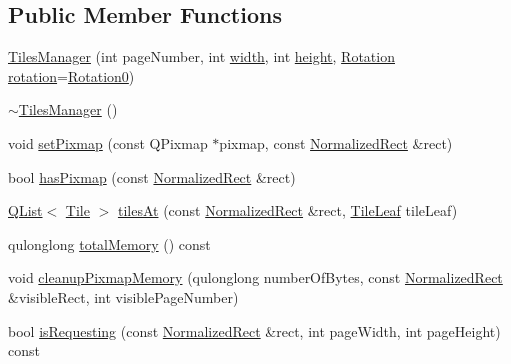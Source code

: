 \subsection*{Public Member Functions}
\begin{DoxyCompactItemize}
\item 
\hyperlink{classOkular_1_1TilesManager_ad9384239a9dadf71c03a123bb46f81f9}{Tiles\+Manager} (int page\+Number, int \hyperlink{classOkular_1_1TilesManager_a88a40f389b20ca54314754aff2392889}{width}, int \hyperlink{classOkular_1_1TilesManager_a4a2fc0597872d6cd291630c2e4bf6986}{height}, \hyperlink{namespaceOkular_a8556d00465f61ef533c6b027669e7da6}{Rotation} \hyperlink{classOkular_1_1TilesManager_af09b92144bc61eb3d499e56b18bbba4f}{rotation}=\hyperlink{namespaceOkular_a8556d00465f61ef533c6b027669e7da6aa4df8fc3dd09e30520c264c8d23d89c2}{Rotation0})
\item 
\hyperlink{classOkular_1_1TilesManager_af1e37d42b705031cc2572328d1d34e88}{$\sim$\+Tiles\+Manager} ()
\item 
void \hyperlink{classOkular_1_1TilesManager_ad7d59e5d6f4a9744ecd98f052b260b79}{set\+Pixmap} (const Q\+Pixmap $\ast$pixmap, const \hyperlink{classOkular_1_1NormalizedRect}{Normalized\+Rect} \&rect)
\item 
bool \hyperlink{classOkular_1_1TilesManager_ab0042fc9b9267a15d67d7f2d29471619}{has\+Pixmap} (const \hyperlink{classOkular_1_1NormalizedRect}{Normalized\+Rect} \&rect)
\item 
\hyperlink{classQList}{Q\+List}$<$ \hyperlink{classOkular_1_1Tile}{Tile} $>$ \hyperlink{classOkular_1_1TilesManager_a11cc64225aa62df9d25e294ce71e4dcf}{tiles\+At} (const \hyperlink{classOkular_1_1NormalizedRect}{Normalized\+Rect} \&rect, \hyperlink{classOkular_1_1TilesManager_a89f92ae8fdfb530b5625343876f63e29}{Tile\+Leaf} tile\+Leaf)
\item 
qulonglong \hyperlink{classOkular_1_1TilesManager_a7baf6b1ce882f1fea1499fa956097c23}{total\+Memory} () const 
\item 
void \hyperlink{classOkular_1_1TilesManager_a68c693eb588798c65c6dc66c226cf789}{cleanup\+Pixmap\+Memory} (qulonglong number\+Of\+Bytes, const \hyperlink{classOkular_1_1NormalizedRect}{Normalized\+Rect} \&visible\+Rect, int visible\+Page\+Number)
\item 
bool \hyperlink{classOkular_1_1TilesManager_a9ae541417a9a6ef69d405442aa5271be}{is\+Requesting} (const \hyperlink{classOkular_1_1NormalizedRect}{Normalized\+Rect} \&rect, int page\+Width, int page\+Height) const 
\item 

\end{DoxyCompactItemize}
